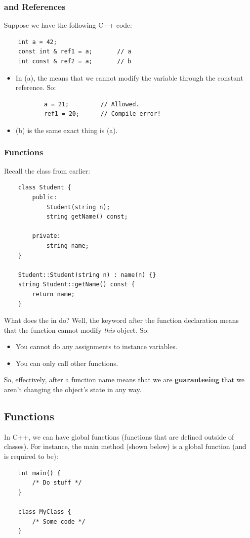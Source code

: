 \documentclass[letterpaper]{article}
\begin{document}
\subsubsection{ and References}
Suppose we have the following C++ code: 
\begin{verbatim}
    int a = 42; 
    const int & ref1 = a;       // a
    int const & ref2 = a;       // b
\end{verbatim}
\begin{itemize}
    \item In (a), the  means that we cannot modify the variable through the constant reference. So: 
    \begin{verbatim}
        a = 21;         // Allowed. 
        ref1 = 20;      // Compile error!
    \end{verbatim}

    \item (b) is the same exact thing is (a).
\end{itemize}

\subsubsection{ Functions}
Recall the  class from earlier: 
\begin{verbatim}
    class Student {
        public: 
            Student(string n);
            string getName() const; 
            
        private: 
            string name; 
    }

    Student::Student(string n) : name(n) {}
    string Student::getName() const {
        return name;
    }
\end{verbatim}
What does the  in  do? Well, the  keyword after the function declaration means that the function cannot modify \emph{this} object. So: 
\begin{itemize}
    \item You cannot do any assignments to instance variables. 
    \item You can only call other  functions.
\end{itemize} 
So, effectively,  after a function name means that we are \textbf{guaranteeing} that we aren't changing the object's state in any way.

\subsection{Functions}
In C++, we can have global functions (functions that are defined outside of classes). For instance, the main method (shown below) is a global function (and is required to be):
\begin{verbatim}
    int main() {
        /* Do stuff */ 
    }

    class MyClass {
        /* Some code */ 
    }
\end{verbatim}
\end{document}
